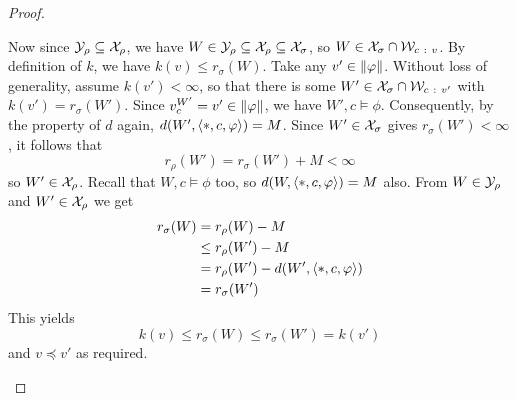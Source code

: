 \begin{proof}
\begin{claimproof}
            Now since $\mathcal{Y}_\rho \subseteq \mathcal{X}_\rho$, we have $W \in \mathcal{Y}_\rho
            \subseteq \mathcal{X}_\rho \subseteq \mathcal{X}_\sigma$, so $W \in \mathcal{X}_\sigma \cap
            \mathcal{W}_{c\ :\  v}$. By definition of $k$, we have $k(v) \le
            r_\sigma(W)$. Take any $v' \in \|{\varphi}\|$. Without loss of
            generality, assume $k(v') < \infty$, so that there is some $W' \in
            \mathcal{X}_\sigma \cap \mathcal{W}_{c\ :\  v'}$ with $k(v') = r_\sigma(W')$. Since
            $v^{W'}_c = v' \in \|{\varphi}\|$, we have $W', c \models \phi$.
            Consequently, by the property of $d$ again, $d(W', \langle {\ast, c,
            \varphi} \rangle) = M$. Since $W' \in \mathcal{X}_\sigma$ gives $r_\sigma(W') <
            \infty$, it follows that
            \[
                r_\rho(W') = r_\sigma(W') + M < \infty
            \]
            so $W' \in \mathcal{X}_\rho$.
            Recall that $W, c \models \phi$ too, so $d(W, \langle {\ast, c,
            \varphi} \rangle) = M$ also. From $W \in \mathcal{Y}_\rho$ and $W' \in \mathcal{X}_\rho$ we get
            \begin{align*}
                r_\sigma(W)
                &= r_\rho(W) - M \\
                &\le r_\rho(W') - M \\
                &= r_\rho(W') - d(W', \langle {\ast, c, \varphi} \rangle) \\
                &= r_\sigma(W')
            \end{align*}
            This yields
            \[
                k(v) \le r_\sigma(W) \le r_\sigma(W') = k(v')
            \]
            and $v \preceq v'$ as required.



\end{claimproof}
\end{proof}
